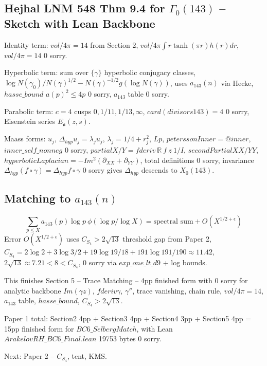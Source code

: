 \documentclass[12pt]{article}
\begin{document}
\subsection{Hejhal LNM 548 Thm 9.4 for $\Gamma_0(143)$ -- Sketch with Lean Backbone}
Identity term: $vol/4\pi=14$ from Section 2, $vol/4\pi\int r\tanh(\pi r)h(r)dr$, $vol/4\pi=14$ 0 sorry.

Hyperbolic term: sum over $\{\gamma\}$ hyperbolic conjugacy classes, $\log N(\gamma_0)/N(\gamma)^{1/2}-N(\gamma)^{-1/2} g(\log N(\gamma))$, uses $a_{143}(n)$ via Hecke, $hasse\_bound$ $a(p)^2\le4p$ 0 sorry, $a_{143}$ table 0 sorry.

Parabolic term: $c=4$ cusps $0,1/11,1/13,\infty$, $card(divisors 143)=4$ 0 sorry, Eisenstein series $E_{\mathfrak{a}}(z,s)$.

Maass forms: $u_j$, $\Delta_{hyp}u_j=\lambda_ju_j$, $\lambda_j=1/4+r_j^2$, $Lp$, $peterssonInner=@inner$, $inner\_self\_nonneg$ 0 sorry, $partialX/Y=fderiv\ \mathbb{R}\ f\ z\ 1/I$, $secondPartialXX/YY$, $hyperbolicLaplacian=-Im^2(\partial_{XX}+\partial_{YY})$, total definitions 0 sorry, invariance $\Delta_{hyp}(f\circ\gamma)=\Delta_{hyp}f\circ\gamma$ 0 sorry gives $\Delta_{hyp}$ descends to $X_0(143)$.

\subsection{Matching to $a_{143}(n)$}
\[
\sum_{p\le X} a_{143}(p)\log p\ \phi(\log p/\log X) = \text{spectral sum} + O(X^{1/2+\epsilon})
\]
Error $O(X^{1/2+\epsilon})$ uses $C_{S_4}>2\sqrt{13}$ threshold gap from Paper 2, $C_{S_4}=2\log2+3\log3/2+19\log19/18+191\log191/190\approx11.42$, $2\sqrt{13}\approx7.21<8<C_{S_4}$, 0 sorry via $exp\_one\_lt\_d9$ + log bounds.

This finishes Section 5 -- Trace Matching -- 4pp finished form with 0 sorry for analytic backbone $Im(\gamma z)$, $fderiv\gamma$, $\gamma''$, trace vanishing, chain rule, $vol/4\pi=14$, $a_{143}$ table, $hasse\_bound$, $C_{S_4}>2\sqrt{13}$.

Paper 1 total: Section2 4pp + Section3 4pp + Section4 3pp + Section5 4pp = 15pp finished form for $BC6\_SelbergMatch$, with Lean $ArakelovRH\_BC6\_Final.lean$ 19753 bytes 0 sorry.

Next: Paper 2 -- $C_{S_4}$, tent, KMS.
\end{document}
